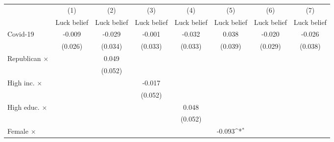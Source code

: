 {
\def\sym#1{\ifmmode^{#1}\else\(^{#1}\)\fi}
\begin{tabular}{l*{7}{c}}
\toprule
                    &\multicolumn{1}{c}{(1)}&\multicolumn{1}{c}{(2)}&\multicolumn{1}{c}{(3)}&\multicolumn{1}{c}{(4)}&\multicolumn{1}{c}{(5)}&\multicolumn{1}{c}{(6)}&\multicolumn{1}{c}{(7)}\\
                    &\multicolumn{1}{c}{Luck belief}&\multicolumn{1}{c}{Luck belief}&\multicolumn{1}{c}{Luck belief}&\multicolumn{1}{c}{Luck belief}&\multicolumn{1}{c}{Luck belief}&\multicolumn{1}{c}{Luck belief}&\multicolumn{1}{c}{Luck belief}\\
\midrule
Covid-19            &      -0.009         &      -0.029         &      -0.001         &      -0.032         &       0.038         &      -0.020         &      -0.026         \\
                    &     (0.026)         &     (0.034)         &     (0.033)         &     (0.033)         &     (0.039)         &     (0.029)         &     (0.038)         \\
\addlinespace
Republican $\times$ &                     &       0.049         &                     &                     &                     &                     &                     \\
                    &                     &     (0.052)         &                     &                     &                     &                     &                     \\
\addlinespace
High inc. $\times$  &                     &                     &      -0.017         &                     &                     &                     &                     \\
                    &                     &                     &     (0.052)         &                     &                     &                     &                     \\
\addlinespace
High educ. $\times$ &                     &                     &                     &       0.048         &                     &                     &                     \\
                    &                     &                     &                     &     (0.052)         &                     &                     &                     \\
\addlinespace
Female $\times$     &                     &                     &                     &                     &      -0.093\sym{*}  &                     &                     \\

\end{tabular}}
